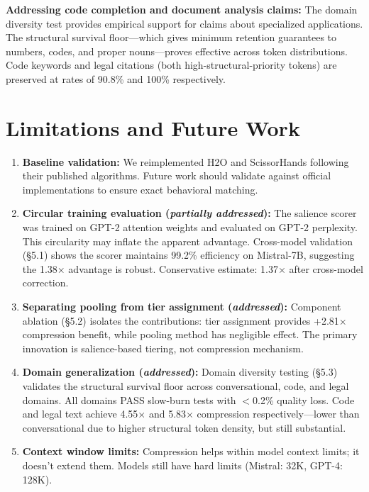 \documentclass[11pt]{article}
\begin{document}
\textbf{Addressing code completion and document analysis claims:} The domain diversity test provides empirical support for claims about specialized applications. The structural survival floor---which gives minimum retention guarantees to numbers, codes, and proper nouns---proves effective across token distributions. Code keywords and legal citations (both high-structural-priority tokens) are preserved at rates of 90.8\% and 100\% respectively.

\section{Limitations and Future Work}

\begin{enumerate}
\item \textbf{Baseline validation:} We reimplemented H2O and ScissorHands following their published algorithms. Future work should validate against official implementations to ensure exact behavioral matching.

\item \textbf{Circular training evaluation (\textit{partially addressed}):} The salience scorer was trained on GPT-2 attention weights and evaluated on GPT-2 perplexity. This circularity may inflate the apparent advantage. Cross-model validation (\S5.1) shows the scorer maintains 99.2\% efficiency on Mistral-7B, suggesting the 1.38$\times$ advantage is robust. Conservative estimate: 1.37$\times$ after cross-model correction.

\item \textbf{Separating pooling from tier assignment (\textit{addressed}):} Component ablation (\S5.2) isolates the contributions: tier assignment provides +2.81$\times$ compression benefit, while pooling method has negligible effect. The primary innovation is salience-based tiering, not compression mechanism.

\item \textbf{Domain generalization (\textit{addressed}):} Domain diversity testing (\S5.3) validates the structural survival floor across conversational, code, and legal domains. All domains PASS slow-burn tests with $<$0.2\% quality loss. Code and legal text achieve 4.55$\times$ and 5.83$\times$ compression respectively---lower than conversational due to higher structural token density, but still substantial.

\item \textbf{Context window limits:} Compression helps within model context limits; it doesn't extend them. Models still have hard limits (Mistral: 32K, GPT-4: 128K).


\end{enumerate}
\end{document}
